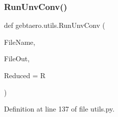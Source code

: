 \subsubsection{\texorpdfstring{Run\+Unv\+Conv()}{RunUnvConv()}}
{\footnotesize\ttfamily def gebtaero.\+utils.\+Run\+Unv\+Conv (\begin{DoxyParamCaption}\item[{}]{File\+Name,  }\item[{}]{File\+Out,  }\item[{}]{Reduced = {\ttfamily \textquotesingle{}R\textquotesingle{}} }\end{DoxyParamCaption})}



Definition at line 137 of file utils.\+py.

